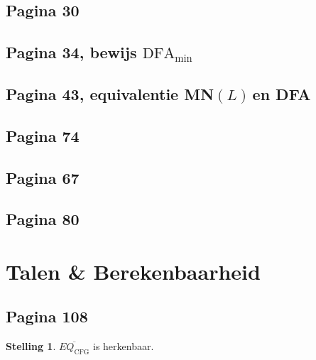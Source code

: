 \documentclass[kulak]{kulakarticle}
\newcommand{\DFA}{\text{DFA}}
\newcommand{\CFG}{\text{CFG}}
\newcommand{\mnl}{MN\((L)\)}
\theoremstyle{definition}
\newtheorem*{stelling}{Stelling}
\begin{document}
	

	\subsection*{Pagina 30}

	

	\newpage
	\subsection*{Pagina 34, bewijs \( \DFA_{\text{min}} \)}

	

	\newpage
	\subsection*{Pagina 43, equivalentie \mnl \,en DFA}

	

	\subsection*{Pagina 74}

	

	\subsection*{Pagina 67}

	

	\newpage
	\subsection*{Pagina 80}

	

	\newpage

	\section{Talen \& Berekenbaarheid}

	\subsection*{Pagina 108}

	\begin{stelling}
		\(\overline{EQ_\CFG}\) is herkenbaar.
	\end{stelling}
\end{document}
